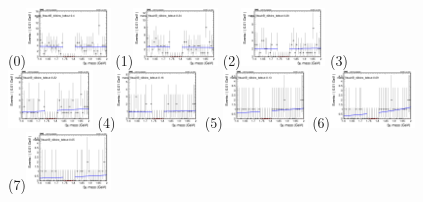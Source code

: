 \begin{figure}[h!]
        \centering
        \subfigure(0){\includegraphics[width=0.2\textwidth]{power_law/plots/tauhB/massfit_tauhB_40bins_bdtcut-0.4.png}}
        \subfigure(1){\includegraphics[width=0.2\textwidth]{power_law/plots/tauhB/massfit_tauhB_40bins_bdtcut-0.34.png}}
        \subfigure(2){\includegraphics[width=0.2\textwidth]{power_law/plots/tauhB/massfit_tauhB_40bins_bdtcut-0.28.png}}
        \subfigure(3){\includegraphics[width=0.2\textwidth]{power_law/plots/tauhB/massfit_tauhB_40bins_bdtcut-0.22.png}}
        \subfigure(4){\includegraphics[width=0.2\textwidth]{power_law/plots/tauhB/massfit_tauhB_40bins_bdtcut-0.16.png}}
        \subfigure(5){\includegraphics[width=0.2\textwidth]{power_law/plots/tauhB/massfit_tauhB_40bins_bdtcut-0.13.png}}
        \subfigure(6){\includegraphics[width=0.2\textwidth]{power_law/plots/tauhB/massfit_tauhB_40bins_bdtcut-0.09.png}}
        \subfigure(7){\includegraphics[width=0.2\textwidth]{power_law/plots/tauhB/massfit_tauhB_40bins_bdtcut-0.05.png}}

\end{figure}
